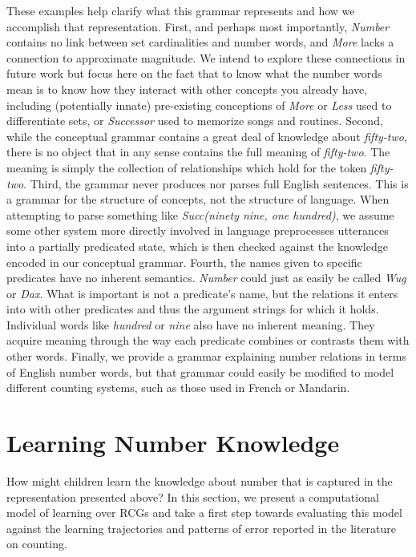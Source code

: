 \documentclass[10pt,letterpaper]{article}
\begin{document}
These examples help clarify what this grammar represents and how we
accomplish that representation. First, and perhaps most importantly,
\emph{Number} contains no link between set cardinalities and number
words, and \emph{More} lacks a connection to approximate magnitude. We
intend to explore these connections in future work but focus here on
the fact that to know what the number words mean is to know how they
interact with other concepts you already have, including (potentially
innate) pre-existing conceptions of \emph{More} or \emph{Less} used to
differentiate sets, or \emph{Successor} used to memorize songs and
routines. Second, while the conceptual grammar contains a great deal
of knowledge about \emph{fifty-two}, there is no object that in any
sense contains the full meaning of \emph{fifty-two}. The meaning is
simply the collection of relationships which hold for the token
\emph{fifty-two}. Third, the grammar never produces nor parses full
English sentences. This is a grammar for the structure of concepts,
not the structure of language. When attempting to parse something like
\emph{Succ(ninety nine, one hundred)}, we assume some other system
more directly involved in language preprocesses utterances into a
partially predicated state, which is then checked against the
knowledge encoded in our conceptual grammar. Fourth, the names given
to specific predicates have no inherent semantics. \emph{Number} could
just as easily be called \emph{Wug} or \emph{Dax}. What is important
is not a predicate's name, but the relations it enters into with other
predicates and thus the argument strings for which it holds.
Individual words like \emph{hundred} or \emph{nine} also have no
inherent meaning. They acquire meaning through the way each predicate
combines or contrasts them with other words. Finally, we provide a
grammar explaining number relations in terms of English number words,
but that grammar could easily be modified to model different counting
systems, such as those used in French or Mandarin.

\section{Learning Number Knowledge}


How might children learn the knowledge about number that is captured
in the representation presented above? In this section, we present a
computational model of learning over RCGs and take a first step
towards evaluating this model against the learning trajectories and
patterns of error reported in the literature on counting. 
\end{document}
